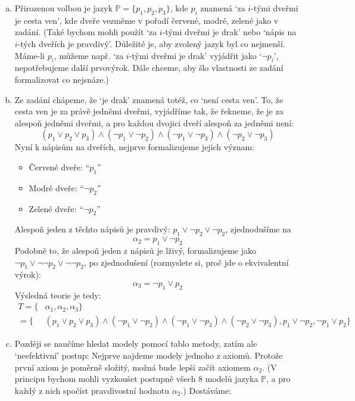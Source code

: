 \begin{problem}
    \begin{solution}
        \begin{enumerate}[(a)]
            \item Přirozenou volbou je jazyk $\mathbb P=\{p_1, p_2, p_3\}$, kde $p_i$ znamená `za $i$-tými dveřmi je cesta ven', kde dveře vezměme v pořadí červené, modré, zelené jako v zadání. (Také bychom mohli použít `za $i$-tými dveřmi je drak' nebo `nápis na $i$-tých dveřích je pravdivý'. Důležité je, aby zvolený jazyk byl co nejmenší. Máme-li $p_i$, můžeme např. `za $i$-tými dveřmi je drak' vyjádřit jako `$\neg p_i$', nepotřebujeme další prvovýrok. Dále chceme, aby šlo vlastnosti ze zadání formalizovat co nejsnáze.)
            \item Ze zadání chápeme, že `je drak' znamená totéž, co `není cesta ven'. To, že cesta ven je za právě jedněmi dveřmi, vyjádříme tak, že řekneme, že je za alespoň jedněmi dveřmi, a pro každou dvojici dveří alespoň za jedněmi není:
            $$
            (p_1\lor p_2\lor p_3) \land (\neg p_1\lor\neg p_2) \land  (\neg p_1\lor\neg p_3) \land (\neg p_2\lor\neg p_3)
            $$
            Nyní k nápisům na dveřích, nejprve formalizujeme jejich význam:
            \begin{itemize}
                \item Červené dveře: ``$p_1$''
                \item Modré dveře: ``$\neg p_2$''
                \item Zelené dveře: ``$\neg p_2$''
            \end{itemize}
            Alespoň jeden z těchto nápisů je pravdivý: $p_1\lor \neg p_2\lor\neg p_2$, zjednodušíme na
            $$
            \alpha_2=p_1\lor \neg p_2
            $$
            Podobně to, že alespoň jeden z nápisů je lživý, formalizujeme jako $\neg p_1\lor \neg \neg p_2\lor\neg \neg p_2$, po zjednodušení (rozmyslete si, proč jde o ekvivalentní výrok):
            $$
            \alpha_3=\neg p_1\lor p_2
            $$
            Výsledná teorie je tedy:
            \begin{align*}
                T=\{&\alpha_1,\alpha_2,\alpha_3\}\\=\{&(p_1\lor p_2\lor p_3) \land (\neg p_1\lor\neg p_2) \land  (\neg p_1\lor\neg p_3) \land (\neg p_2\lor\neg p_3), p_1\lor \neg p_2, \neg p_1\lor p_2\}
            \end{align*}
            \item Později se naučíme hledat modely pomocí tablo metody, zatím ale `neefektivní' postup: Nejprve najdeme modely jednoho z axiomů. Protože první axiom je poměrně složitý, možná bude lepší začít axiomem $\alpha_2$. (V principu bychom mohli vyzkoušet postupně všech 8 modelů jazyka $\mathbb P$, a pro každý z nich spočíst pravdivostní hodnotu $\alpha_2$.) Dostáváme:

\end{enumerate}
\end{solution}
\end{problem}
